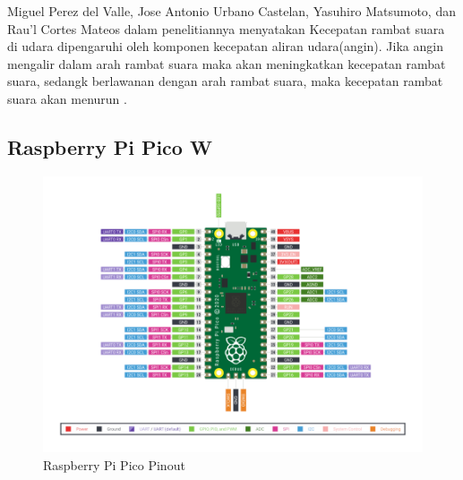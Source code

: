 Miguel Perez del Valle, Jose Antonio Urbano Castelan, Yasuhiro Matsumoto, dan Rau’l Cortes Mateos dalam penelitiannya menyatakan 
Kecepatan rambat suara di udara dipengaruhi oleh komponen kecepatan aliran udara(angin). Jika angin mengalir dalam arah rambat 
suara maka akan meningkatkan kecepatan rambat suara, sedangk berlawanan dengan arah rambat suara, maka 
kecepatan rambat suara akan menurun \parencite{del2007low}.

\subsection{Raspberry Pi Pico W}

\begin{figure}[h!]
	\centering
	\includegraphics[width=0.7\linewidth]{"gambar/pico pinout"}
	\caption{Raspberry Pi Pico Pinout \parencite{figPicoPinout}}
	\label{fig:pico-pinout}
\end{figure}

